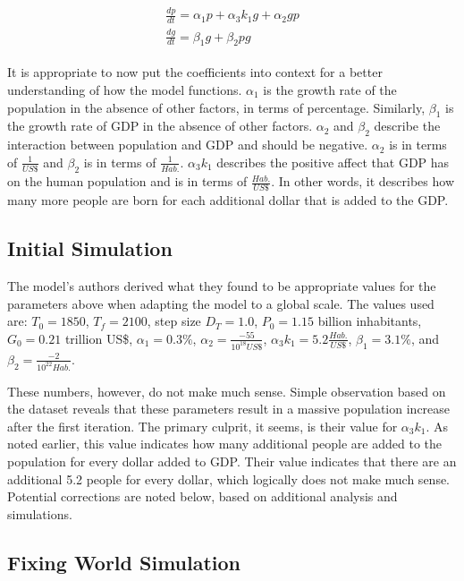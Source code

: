\documentclass[a4paper]{article}
\begin{document}
\begin{align}
\begin{split}
\label{eq:lvfin}
	\frac{dp}{dt} = \alpha_1 p + \alpha_3 k_1 g + \alpha_2 g p \\
	\frac{dg}{dt} = \beta_1 g + \beta_2 p g
\end{split}
\end{align}

It is appropriate to now put the coefficients into context for a better understanding of how the model functions. $\alpha_1$ is the growth rate of the population in the absence of other factors, in terms of percentage. Similarly, $\beta_1$ is the growth rate of GDP in the absence of other factors. $\alpha_2$ and $\beta_2$ describe the interaction between population and GDP and should be negative. $\alpha_2$ is in terms of $\frac{1}{US\$}$ and $\beta_2$ is in terms of $\frac{1}{Hab.}$. $\alpha_3 k_1$ describes the positive affect that GDP has on the human population and is in terms of $\frac{Hab.}{US\$}$. In other words, it describes how many more people are born for each additional dollar that is added to the GDP. 

\subsection{Initial Simulation}

The model's authors derived what they found to be appropriate values for the parameters above when adapting the model to a global scale. The values used are: $T_0 = 1850$, $T_f = 2100$, step size $D_T = 1.0$, $P_0 = 1.15$ billion inhabitants, $G_0 = 0.21$ trillion US\$, $\alpha_1 = 0.3\%$, $\alpha_2 = \frac{-55}{10^{18} US\$}$, $\alpha_3 k_1 = 5.2 \frac{Hab.}{US \$}$, $\beta_1 = 3.1\%$, and $\beta_2 = \frac{-2}{10^{22} Hab.}$. 

These numbers, however, do not make much sense. Simple observation based on the dataset reveals that these parameters result in a massive population increase after the first iteration. The primary culprit, it seems, is their value for $\alpha_3 k_1$. As noted earlier, this value indicates how many additional people are added to the population for every dollar added to GDP. Their value indicates that there are an additional 5.2 people for every dollar, which logically does not make much sense. Potential corrections are noted below, based on additional analysis and simulations.

\subsection{Fixing World Simulation}
\end{document}
